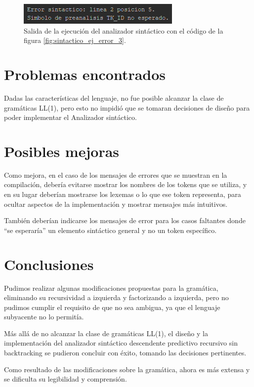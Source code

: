 \begin{figure}[H]
\centering
\includegraphics[scale=1]{img/sintactico/salida_sintactico_ej_error_3.png}
\caption{Salida de la ejecución del analizador sintáctico con el código de la figura \ref{fig:sintactico_ej_error_3}.}
\label{fig:sintactico_ej_error_3_salida}
\end{figure}

\section{Problemas encontrados}
Dadas las características del lenguaje, no fue posible alcanzar la clase de gramáticas LL(1), pero esto no impidió que se tomaran decisiones de diseño para poder implementar el Analizador sintáctico.

\section{Posibles mejoras}
Como mejora, en el caso de los mensajes de errores que se muestran en la compilación, debería evitarse mostrar los nombres de los tokens que se utiliza, y en su lugar deberían mostrarse los lexemas o lo que ese token representa, para ocultar aspectos de la implementación y mostrar mensajes más intuitivos.

También deberían indicarse los mensajes de error para los casos faltantes donde ``se esperaría'' un elemento sintáctico general y no un token específico.

\section{Conclusiones}
Pudimos realizar algunas modificaciones propuestas para la gramática, eliminando su recursividad a izquierda y factorizando a izquierda, pero no pudimos cumplir el requisito de que no sea ambigua, ya que el lenguaje subyacente no lo permitía. 

Más allá de no alcanzar la clase de gramáticas LL(1), el diseño y la implementación del analizador sintáctico descendente predictivo recursivo sin backtracking se pudieron concluir con éxito, tomando las decisiones pertinentes. 

Como resultado de las modificaciones sobre la gramática, ahora es más extensa y se dificulta su legibilidad y comprensión.